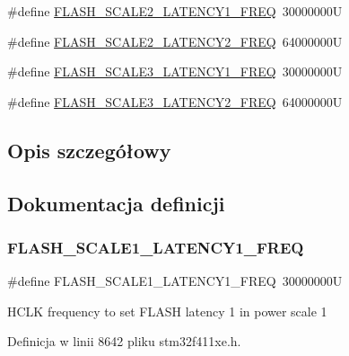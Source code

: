\begin{DoxyCompactItemize}
\item 
\#define \hyperlink{group___exported__macros_ga19ba80e0c72cd041274f831901f302f9}{F\+L\+A\+S\+H\+\_\+\+S\+C\+A\+L\+E2\+\_\+\+L\+A\+T\+E\+N\+C\+Y1\+\_\+\+F\+R\+EQ}~30000000U
\item 
\#define \hyperlink{group___exported__macros_ga98847021d5de23ea0458b490c74e6299}{F\+L\+A\+S\+H\+\_\+\+S\+C\+A\+L\+E2\+\_\+\+L\+A\+T\+E\+N\+C\+Y2\+\_\+\+F\+R\+EQ}~64000000U
\item 
\#define \hyperlink{group___exported__macros_ga322840abc74aeafafe710d45e4f9c7cd}{F\+L\+A\+S\+H\+\_\+\+S\+C\+A\+L\+E3\+\_\+\+L\+A\+T\+E\+N\+C\+Y1\+\_\+\+F\+R\+EQ}~30000000U
\item 
\#define \hyperlink{group___exported__macros_ga9a6fd257610db9111ae2a291825a86d0}{F\+L\+A\+S\+H\+\_\+\+S\+C\+A\+L\+E3\+\_\+\+L\+A\+T\+E\+N\+C\+Y2\+\_\+\+F\+R\+EQ}~64000000U
\end{DoxyCompactItemize}


\subsection{Opis szczegółowy}


\subsection{Dokumentacja definicji}
\mbox{\label{group___exported__macros_ga980965268c210a75ca5bb1e6b59b4052}} 
\subsubsection{\texorpdfstring{F\+L\+A\+S\+H\+\_\+\+S\+C\+A\+L\+E1\+\_\+\+L\+A\+T\+E\+N\+C\+Y1\+\_\+\+F\+R\+EQ}{FLASH\_SCALE1\_LATENCY1\_FREQ}}
{\footnotesize\ttfamily \#define F\+L\+A\+S\+H\+\_\+\+S\+C\+A\+L\+E1\+\_\+\+L\+A\+T\+E\+N\+C\+Y1\+\_\+\+F\+R\+EQ~30000000U}

H\+C\+LK frequency to set F\+L\+A\+SH latency 1 in power scale 1 

Definicja w linii 8642 pliku stm32f411xe.\+h.

